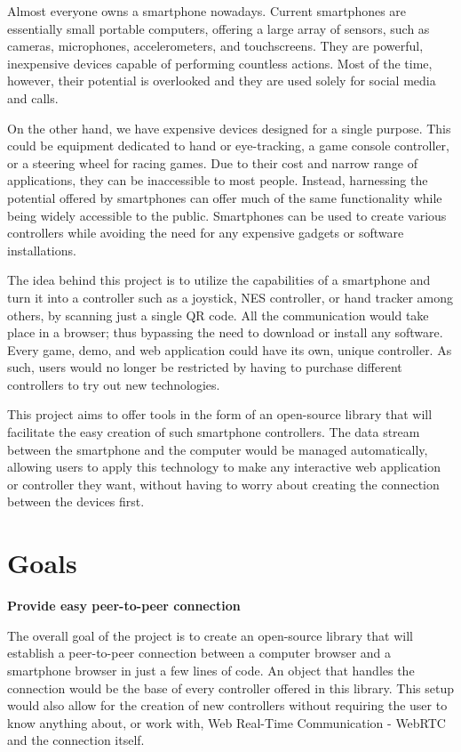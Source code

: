 \documentclass{l4proj}
\begin{document}
Almost everyone owns a smartphone nowadays. Current smartphones are essentially small portable computers, offering a large array of sensors, such as cameras, microphones, accelerometers, and touchscreens. They are powerful, inexpensive devices capable of performing countless actions. Most of the time, however, their potential is overlooked and they are used solely for social media and calls.  \par

On the other hand, we have expensive devices designed for a single purpose. This could be equipment dedicated to hand or eye-tracking, a game console controller, or a steering wheel for racing games. Due to their cost and narrow range of applications, they can be inaccessible to most people. Instead, harnessing the potential offered by smartphones can offer much of the same functionality while being widely accessible to the public. Smartphones can be used to create various controllers while avoiding the need for any expensive gadgets or software installations. \par

The idea behind this project is to utilize the capabilities of a smartphone and turn it into a controller such as a joystick, NES controller, or hand tracker among others, by scanning just a single QR code. All the communication would take place in a browser; thus bypassing the need to download or install any software. Every game, demo, and web application could have its own, unique controller. As such, users would no longer be restricted by having to purchase different controllers to try out new technologies. \par 

This project aims to offer tools in the form of an open-source library that will facilitate the easy creation of such smartphone controllers. The data stream between the smartphone and the computer would be managed automatically, allowing users to apply this technology to make any interactive web application or controller they want, without having to worry about creating the connection between the devices first. 

\section{Goals}

\textbf{Provide easy peer-to-peer connection} \par
The overall goal of the project is to create an open-source library that will establish a peer-to-peer connection between a computer browser and a smartphone browser in just a few lines of code. An object that handles the connection would be the base of every controller offered in this library. This setup would also allow for the creation of new controllers without requiring the user to know anything about, or work with, Web Real-Time Communication - WebRTC and the connection itself. \par
\end{document}
